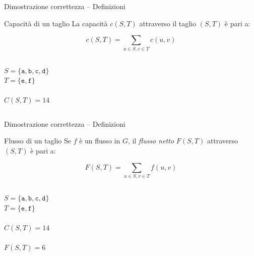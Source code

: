 \begin{frame}{Dimostrazione correttezza -- Definizioni}

\vspace{-12pt}
\begin{block}{Capacità di un taglio}
La \alert{capacità} $c(S,T)$ attraverso il taglio $(S,T)$ è pari a:

\[
  c(S,T) = \sum_{u \in S, v \in T} c(u,v)
\]
\end{block}

\vspace{-12pt}
\begin{columns}[T]
\vspace{18pt}
$S = \{ \mathtt{a}, \mathtt{b}, \mathtt{c}, \mathtt{d} \}$\\
$T = \{ \mathtt{e}, \mathtt{f} \}$\\
~\\
$C(S,T) = 14$
\end{columns}

\end{frame}

\begin{frame}{Dimostrazione correttezza -- Definizioni}

\vspace{-12pt}
\begin{block}{Flusso di un taglio}
Se $f$ è un flusso in $G$, il {\em flusso netto} $F(S,T)$ 
attraverso $(S,T)$ è pari a:

\[
  F(S,T) = \sum_{u \in S, v \in T} f(u,v)
\]
\end{block}

\vspace{-12pt}
\begin{columns}[T]
\vspace{18pt}
$S = \{ \mathtt{a}, \mathtt{b}, \mathtt{c}, \mathtt{d} \}$\\
$T = \{ \mathtt{e}, \mathtt{f} \}$\\
~\\
$C(S,T) = 14$\\
~\\
$F(S,T) = 6$
\end{columns}

\end{frame}

